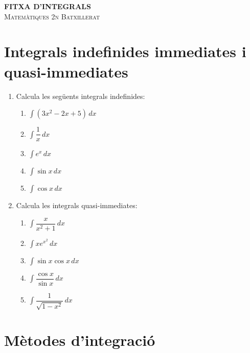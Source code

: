 \documentclass[12pt]{article}
\begin{document}
\begin{center}
    {\Large \textbf{FITXA D'INTEGRALS}} \\
    \vspace{0.2cm}
    \textsc{Matemàtiques 2n Batxillerat}
\end{center}

\vspace{0.5cm}

\section*{Integrals indefinides immediates i quasi-immediates}

\begin{enumerate}[label=\arabic*.]
    \item Calcula les següents integrals indefinides:
    \begin{enumerate}[label=\alph*)]
        \item $\displaystyle \int (3x^2-2x+5)\,dx$
        \item $\displaystyle \int \dfrac{1}{x}\,dx$
        \item $\displaystyle \int e^x\,dx$
        \item $\displaystyle \int \sin x\,dx$
        \item $\displaystyle \int \cos x\,dx$
    \end{enumerate}

    \item Calcula les integrals quasi-immediates:
    \begin{enumerate}[label=\alph*)]
        \item $\displaystyle \int \dfrac{x}{x^2+1}\,dx$
        \item $\displaystyle \int x e^{x^2}\,dx$
        \item $\displaystyle \int \sin x \cos x\,dx$
        \item $\displaystyle \int \dfrac{\cos x}{\sin x}\,dx$
        \item $\displaystyle \int \dfrac{1}{\sqrt{1-x^2}}\,dx$
    \end{enumerate}
\end{enumerate}

\section*{Mètodes d'integració}
\end{document}
